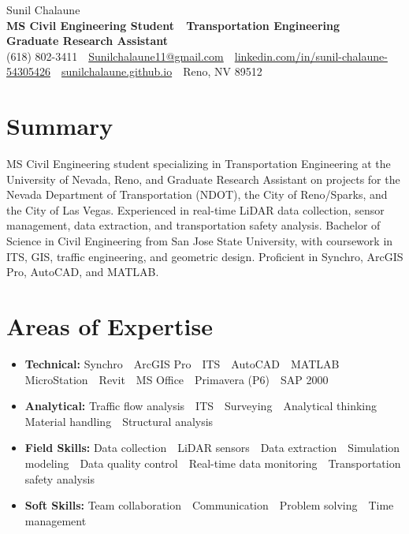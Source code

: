 \documentclass[9pt,letterpaper]{extarticle}
\newcommand{\sep}{\,\textbar\,}
\newcommand{\skill}[2]{\item \textbf{#1:} #2}
\begin{document}
\begin{center}
  {\fontsize{20}{23}\selectfont Sunil Chalaune}\\[4pt]
  \textbf{MS Civil Engineering Student \sep{} Transportation Engineering \sep{} Graduate Research Assistant}\\[1pt]
  (618) 802-3411 \sep{} \href{mailto:Sunilchalaune11@gmail.com}{Sunilchalaune11@gmail.com} \sep{}
  \href{https://www.linkedin.com/in/sunil-chalaune-54305426}{linkedin.com/in/sunil-chalaune-54305426} \sep{}
  \href{https://sunilchalaune.github.io}{sunilchalaune.github.io} \sep{} Reno, NV 89512
\end{center}
\vspace{-6pt}

\section{Summary}
\begin{list}{}{\leftmargin=0.1in\rightmargin=0pt\topsep=0pt\parsep=0pt\itemsep=0pt}\item
MS Civil Engineering student specializing in Transportation Engineering at the University of Nevada, Reno, and
Graduate Research Assistant on projects for the Nevada Department of Transportation (NDOT), the City of
Reno/Sparks, and the City of Las Vegas. Experienced in real-time LiDAR data collection, sensor management, data extraction, and
transportation safety analysis. Bachelor of Science in Civil Engineering from San Jose State University, with
coursework in ITS, GIS, traffic engineering, and geometric design. Proficient in Synchro, ArcGIS Pro, AutoCAD,
and MATLAB.
\end{list}

\section{Areas of Expertise}
\begin{itemize}
  \skill{Technical}{Synchro \sep{} ArcGIS Pro \sep{} ITS \sep{} AutoCAD \sep{} MATLAB \sep{} MicroStation \sep{} Revit \sep{} MS Office \sep{} Primavera (P6) \sep{} SAP 2000}
  \skill{Analytical}{Traffic flow analysis \sep{} ITS \sep{} Surveying \sep{} Analytical thinking \sep{} Material handling \sep{} Structural analysis}
  \skill{Field Skills}{Data collection \sep{} LiDAR sensors \sep{} Data extraction \sep{} Simulation modeling \sep{} Data quality control \sep{} Real-time data monitoring \sep{} Transportation safety analysis}
  \skill{Soft Skills}{Team collaboration \sep{} Communication \sep{} Problem solving \sep{} Time management}
\end{itemize}
\end{document}
